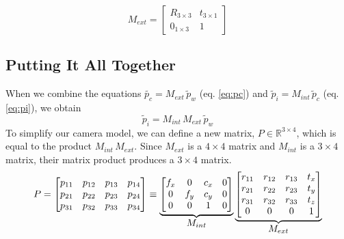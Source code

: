 \begin{equation}
    M_{ext} = 
    \begin{bmatrix}
        R_{3 \times 3} & t_{3 \times 1} \\
        0_{1 \times 3} & 1
    \end{bmatrix} 
\end{equation}

\subsection{Putting It All Together}

When we combine the equations $\widetilde{p_c} = M_{ext}\,\widetilde{p}_w$ (eq. \ref{eq:pc}) and $\widetilde{p}_i = M_{int}\,\widetilde{p}_c$ (eq. \ref{eq:pi}), we obtain
\begin{equation} \label{eq:combined}
    \widetilde{p}_{i} = M_{int}\,M_{ext}\,\widetilde{p}_{w}
\end{equation}
To simplify our camera model, we can define a new matrix, $P \in \mathbb{R}^{3 \times 4}$, which is equal to the product $M_{int}\,M_{ext}$. Since $M_{ext}$ is a $4 \times 4$ matrix and $M_{int}$ is a $3 \times 4$ matrix, their matrix product produces a $3 \times 4$ matrix.
\begin{equation}  
    P=
    \begin{bmatrix}
        p_{11} & p_{12} & p_{13} & p_{14} \\
        p_{21} & p_{22} & p_{23} & p_{24} \\
        p_{31} & p_{32} & p_{33} & p_{34}
    \end{bmatrix}
    \equiv
    \underbrace{
        \begin{bmatrix}
            f_x & 0   & c_x & 0 \\
            0   & f_y & c_y & 0 \\
            0   & 0   & 1   & 0
        \end{bmatrix}
    }_{\mathlarger{M_{int}}}
    \underbrace{
        \begin{bmatrix}
            r_{11} & r_{12} & r_{13} & t_x \\
            r_{21} & r_{22} & r_{23} & t_y \\
            r_{31} & r_{32} & r_{33} & t_z \\
            0      & 0      & 0      & 1
        \end{bmatrix}
    }_{\mathlarger{M_{ext}}}
\end{equation}

